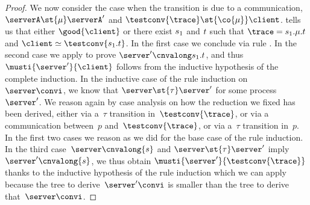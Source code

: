 \begin{proof}
We now consider the case when the transition is due to a communication,
\ie $\serverA \st{\mu} \serverA'$ and $\testconv{ \trace} \st{\co{\mu}} \client$.
tells us that either $\good{\client}$
or there exist $s_1$ and $t$ such that
$\trace = \traceA.\mu.\traceB$ and $\client \simeq \testconv{\traceA.\traceB}$.
In the first case we conclude via rule \mnow.
In the second case we apply
to prove $\server' \cnvalong \traceA.\traceB$, and thus~$\musti{\server'}{\client}$ follows
from the inductive hypothesis of the complete induction.
In the inductive case of the rule induction on~$\server \convi$, we know that
$\server \st{\tau} \server'$ for some process $\server'$.
We reason again by case analysis on how the reduction
we fixed %
has been derived, \ie either via a~$\tau$ transition in~$\testconv{ \trace}$,
or via a communication between~$p$ and~$\testconv{ \trace}$, or via
a~$\tau$ transition in~$p$.
In the first two cases we reason as we did
for the base case of the rule induction.
In the third case~$\server \cnvalong{s}$ and
$\server \st{\tau} \server'$ imply $\server' \cnvalong{s}$, we
thus obtain $\musti{\server'}{\testconv{ \trace}}$ thanks to
the inductive hypothesis of the rule induction
which we can apply because the
tree to derive~$\server' \convi$ is smaller than the tree
to derive that~$\server \convi$.
\end{proof}



